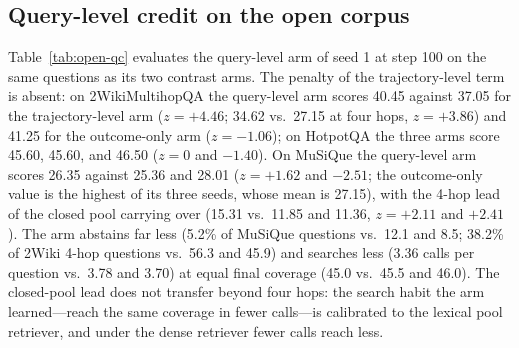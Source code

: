 \begin{table}[t]
\centering
\small
{}
\caption{Trajectory-level coverage versus outcome-only training on the
open corpus: means over the three explicit-seed pairs (step 100, no
open-corpus training), question-level paired McNemar $z$ pooled over
the pairs.}
\label{tab:open-pairs}
\end{table}

\subsection{Query-level credit on the open corpus}
\label{sec:transfer-qc}

Table~\ref{tab:open-qc} evaluates the query-level arm of seed 1 at
step 100 on the same questions as its two contrast arms. The penalty
of the trajectory-level term is absent: on 2WikiMultihopQA the
query-level arm scores 40.45 against 37.05 for the trajectory-level arm
($z=+4.46$; 34.62 vs.\ 27.15 at four hops, $z=+3.86$) and 41.25 for
the outcome-only arm ($z=-1.06$); on HotpotQA the three arms score
45.60, 45.60, and 46.50 ($z=0$ and $-1.40$). On MuSiQue the query-level
arm scores 26.35 against 25.36 and 28.01 ($z=+1.62$ and $-2.51$; the
outcome-only value is the highest of its three seeds, whose mean is
27.15), with the 4-hop lead of the closed pool carrying over (15.31
vs.\ 11.85 and 11.36, $z=+2.11$ and $+2.41$). The arm abstains far
less (5.2\% of MuSiQue questions vs.\ 12.1 and 8.5; 38.2\% of 2Wiki
4-hop questions vs.\ 56.3 and 45.9) and searches less (3.36 calls per
question vs.\ 3.78 and 3.70) at equal final coverage (45.0 vs.\ 45.5
and 46.0). The closed-pool lead does not transfer beyond four hops:
the search habit the arm learned---reach the same coverage in fewer
calls---is calibrated to the lexical pool retriever, and under the
dense retriever fewer calls reach less.

